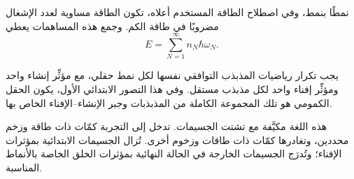 نمطًا بنمط، وفي اصطلاح الطاقة المستخدم أعلاه، تكون الطاقة مساوية لعدد الإشغال مضروبًا في طاقة الكم. وجمع هذه المساهمات يعطي
\begin{equation}
E=\sum_{N=1}^{\infty} n_N\hbar\omega_N.
\end{equation}

يجب تكرار رياضيات المذبذب التوافقي نفسها لكل نمط حقلي، مع مؤثِّر إنشاء واحد ومؤثِّر إفناء واحد لكل مذبذب مستقل. وفي هذا التصور الابتدائي الأول، يكون الحقل الكمومي هو تلك المجموعة الكاملة من المذبذبات وجبر الإنشاء--الإفناء الخاص بها.

هذه اللغة مكيَّفة مع تشتت الجسيمات. تدخل إلى التجربة كمّات ذات طاقة وزخم محددين، وتغادرها كمّات ذات طاقات وزخوم أخرى. تُزال الجسيمات الابتدائية بمؤثرات الإفناء؛ وتُدرَج الجسيمات الخارجة في الحالة النهائية بمؤثرات الخلق الخاصة بالأنماط المناسبة.

\begin{classroomqa}
\end{classroomqa}